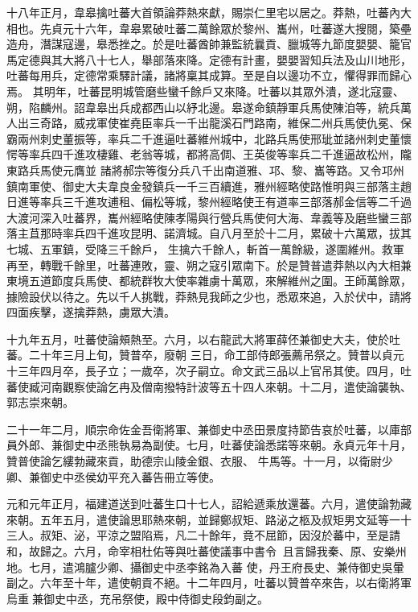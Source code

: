 \begin{pinyinscope}
 十八年正月，韋皋擒吐蕃大首領論莽熱來獻，賜崇仁里宅以居之。莽熱，吐蕃內大相也。先貞元十六年，韋皋累破吐蕃二萬餘眾於黎州、巂州，吐蕃遂大搜閱，築壘造舟，潛謀寇邊，皋悉挫之。於是吐蕃酋帥兼監統曩貢、臘城等九節度嬰嬰、籠官馬定德與其大將八十七人，舉部落來降。定德有計畫，嬰嬰習知兵法及山川地形，吐蕃每用兵，定德常乘驛計議，諸將稟其成算。至是自以邊功不立，懼得罪而歸心焉。
 其明年，吐蕃昆明城管磨些蠻千餘戶又來降。吐蕃以其眾外潰，遂北寇靈、朔，陷麟州。詔韋皋出兵成都西山以紓北邊。皋遂命鎮靜軍兵馬使陳洎等，統兵萬人出三奇路，威戎軍使崔堯臣率兵一千出龍溪石門路南，維保二州兵馬使仇冕、保霸兩州刺史董振等，率兵二千進逼吐蕃維州城中，北路兵馬使邢玼並諸州刺史董懷愕等率兵四千進攻棲雞、老翁等城，都將高倜、王英俊等率兵二千進逼故松州，隴東路兵馬使元膺並
 諸將郝宗等復分兵八千出南道雅、邛、黎、巂等路。又令邛州鎮南軍使、御史大夫韋良金發鎮兵一千三百續進，雅州經略使路惟明與三部落主趙日進等率兵三千進攻逋租、偏松等城，黎州經略使王有道率三部落郝金信等二千過大渡河深入吐蕃界，巂州經略使陳孝陽與行營兵馬使何大海、韋義等及磨些蠻三部落主苴那時率兵四千進攻昆明、諾濟城。自八月至於十二月，累破十六萬眾，拔其七城、五軍鎮，受降三千餘戶，
 生擒六千餘人，斬首一萬餘級，遂圍維州。救軍再至，轉戰千餘里，吐蕃連敗，靈、朔之寇引眾南下。於是贊普遣莽熱以內大相兼東境五道節度兵馬使、都統群牧大使率雜虜十萬眾，來解維州之圍。王師萬餘眾，據險設伏以待之。先以千人挑戰，莽熱見我師之少也，悉眾來追，入於伏中，請將四面疾擊，遂擒莽熱，虜眾大潰。



 十九年五月，吐蕃使論頰熱至。六月，以右龍武大將軍薛伾兼御史大夫，使於吐蕃。二十年三月上旬，贊普卒，廢朝
 三日，命工部侍郎張薦吊祭之。贊普以貞元十三年四月卒，長子立；一歲卒，次子嗣立。命文武三品以上官吊其使。四月，吐蕃使臧河南觀察使論乞冉及僧南撥特計波等五十四人來朝。十二月，遣使論襲執、郭志崇來朝。



 二十一年二月，順宗命佐金吾衛將軍、兼御史中丞田景度持節告哀於吐蕃，以庫部員外郎、兼御史中丞熊執易為副使。七月，吐蕃使論悉諾等來朝。永貞元年十月，贊普使論乞縷勃藏來貢，助德宗山陵金銀、衣服、
 牛馬等。十一月，以衛尉少卿、兼御史中丞侯幼平充入蕃告冊立等使。



 元和元年正月，福建道送到吐蕃生口十七人，詔給遞乘放還蕃。六月，遣使論勃藏來朝。五年五月，遣使論思耶熱來朝，並歸鄭叔矩、路泌之柩及叔矩男文延等一十三人。叔矩、泌，平涼之盟陷焉，凡二十餘年，竟不屈節，因沒於蕃中，至是請和，故歸之。六月，命宰相杜佑等與吐蕃使議事中書令，且言歸我秦、原、安樂州地。七月，遣鴻臚少卿、攝御史中丞李銘為入蕃
 使，丹王府長史、兼侍御史吳暈副之。六年至十年，遣使朝貢不絕。十二年四月，吐蕃以贊普卒來告，以右衛將軍烏重兼御史中丞，充吊祭使，殿中侍御史段鈞副之。




\end{pinyinscope}
